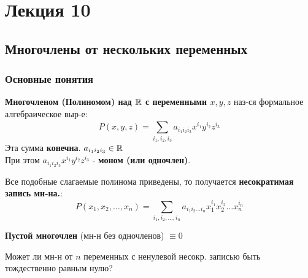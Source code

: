 \section{Лекция 10}
\subsection{Многочлены от нескольких переменных}
\subsubsection{Основные понятия}
\begin{definition}
\textbf{Многочленом (Полиномом) над $\mathbb{R}$ с переменными $x, y, z$} наз-ся формальное алгебраическое выр-е: 
\[
P(x, y, z) = \sum_{i_1, i_2, i_3}^{}a_{i_1i_2i_3}x^{i_1}y^{i_2}z^{i_3}
\]
Эта сумма \textbf{конечна}. $a_{i_1i_2i_3} \in \mathbb{R}$ \\

При этом $a_{i_1i_2i_3}x^{i_1}y^{i_2}z^{i_3}$ - \textbf{моном (или одночлен)}.
\end{definition}
Все подобные слагаемые полинома приведены, то получается \textbf{несократимая запись мн-на.}:
\[
P(x_1, x_2, \ldots, x_n) = \sum_{i_1, i_2, \ldots, i_n}^{} a_{i_1i_2\ldots i_n} x_1^{i_1} x_2^{i_2}\ldots x_n^{i_n}
\]
\begin{note}
\textbf{Пустой многочлен} (мн-н без одночленов) $\equiv 0$
\end{note}

Может ли мн-н от $n$ переменных с ненулевой несокр. записью быть тождественно равным нулю?

